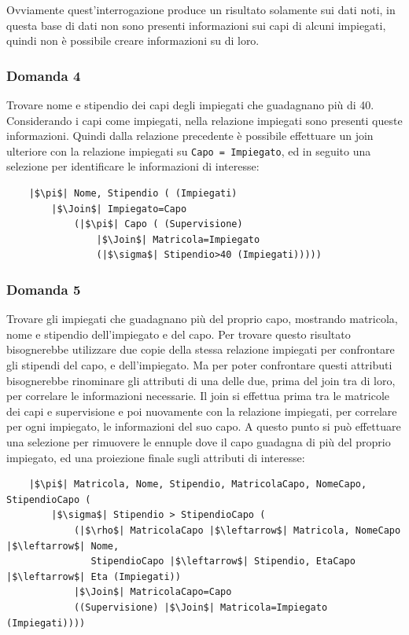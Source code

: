 \documentclass{article}
\numberwithin{equation}{subsection}
\begin{document}
Ovviamente quest'interrogazione produce un risultato solamente sui dati noti, in questa base di dati non sono presenti informazioni sui capi di alcuni impiegati, quindi non è possibile creare informazioni su di loro. 

\subsubsection*{Domanda 4}
Trovare nome e stipendio dei capi degli impiegati che guadagnano più di 40. Considerando i capi come impiegati, nella relazione impiegati sono presenti queste informazioni. Quindi dalla relazione precedente è possibile 
effettuare un join ulteriore con la relazione impiegati su \verb|Capo = Impiegato|, ed in seguito una selezione per identificare le informazioni di interesse:
\begin{verbatim}
    |$\pi$| Nome, Stipendio ( (Impiegati)
        |$\Join$| Impiegato=Capo 
            (|$\pi$| Capo ( (Supervisione)
                |$\Join$| Matricola=Impiegato
                (|$\sigma$| Stipendio>40 (Impiegati)))))
\end{verbatim}

\subsubsection*{Domanda 5}

Trovare gli impiegati che guadagnano più del proprio capo, mostrando matricola, nome e stipendio dell'impiegato e del capo. Per trovare questo risultato bisognerebbe utilizzare due copie della stessa relazione 
impiegati per confrontare gli stipendi del capo, e dell'impiegato. Ma per poter confrontare questi attributi bisognerebbe rinominare gli attributi di una delle due, prima del join tra di loro, per correlare 
le informazioni necessarie. Il join si effettua prima tra le matricole dei capi e supervisione e poi nuovamente con la relazione impiegati, per correlare per ogni impiegato, le informazioni del suo capo. A questo 
punto si può effettuare una selezione per rimuovere le ennuple dove il capo guadagna di più del proprio impiegato, ed una proiezione finale sugli attributi di interesse:

\begin{verbatim}
    |$\pi$| Matricola, Nome, Stipendio, MatricolaCapo, NomeCapo, StipendioCapo (
        |$\sigma$| Stipendio > StipendioCapo (
            (|$\rho$| MatricolaCapo |$\leftarrow$| Matricola, NomeCapo |$\leftarrow$| Nome, 
               StipendioCapo |$\leftarrow$| Stipendio, EtaCapo |$\leftarrow$| Eta (Impiegati))
            |$\Join$| MatricolaCapo=Capo
            ((Supervisione) |$\Join$| Matricola=Impiegato (Impiegati))))
\end{verbatim}
\end{document}
